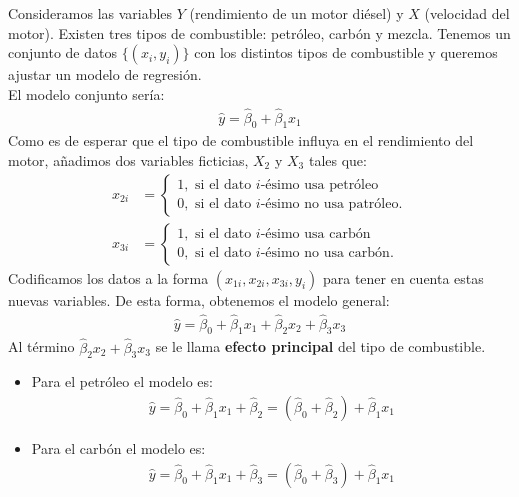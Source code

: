 \begin{ejemplo}
Consideramos las variables $Y$ (rendimiento de un motor diésel) y $X$ (velocidad del motor).
Existen tres tipos de combustible: petróleo, carbón y mezcla. Tenemos un conjunto de datos $\{(x_i, y_i)\}$ con los distintos tipos de combustible y queremos ajustar un modelo de regresión.
\\
\newline
El modelo conjunto sería:
\begin{align*}
     \widehat{y} = \widehat{\beta}_0 + \widehat{\beta}_1x_1   
\end{align*}
Como es de esperar que el tipo de combustible influya en el rendimiento del motor, añadimos dos variables ficticias, $X_2$ y $X_3$ tales que:
\begin{align*}
    x_{2i} &=  \begin{cases}
            1, \text{ si el dato $i$-ésimo usa petróleo} \\
            0, \text{ si el dato $i$-ésimo no usa patróleo}.
        \end{cases}  \\
         x_{3i} &=  \begin{cases}
            1, \text{ si el dato $i$-ésimo usa carbón} \\
            0, \text{ si el dato $i$-ésimo no usa carbón}.
        \end{cases}
\end{align*}
Codificamos los datos a la forma $(x_{1i}, x_{2i}, x_{3i}, y_i)$ para tener en cuenta estas nuevas variables. De esta forma, obtenemos el modelo general:
\begin{align*}
    \widehat{y} = \widehat{\beta}_0 + \widehat{\beta}_1x_1 + \widehat{\beta}_2x_2 + \widehat{\beta}_3x_3
\end{align*}
Al término $\widehat{\beta}_2x_2 + \widehat{\beta}_3x_3$ se le llama \textbf{efecto principal} del tipo de combustible.
\begin{itemize}
    \item Para el petróleo el modelo es:
            \begin{align*}
                  \widehat{y} = \widehat{\beta}_0 + \widehat{\beta}_1x_1 + \widehat{\beta}_2 = (\widehat{\beta}_0 + \widehat{\beta}_2) + \widehat{\beta}_1x_1
            \end{align*}
    \item Para el carbón el modelo es:
            \begin{align*}
                  \widehat{y} = \widehat{\beta}_0 + \widehat{\beta}_1x_1 + \widehat{\beta}_3 = (\widehat{\beta}_0 + \widehat{\beta}_3) + \widehat{\beta}_1x_1

\end{align*}
\end{itemize}
\end{ejemplo}
